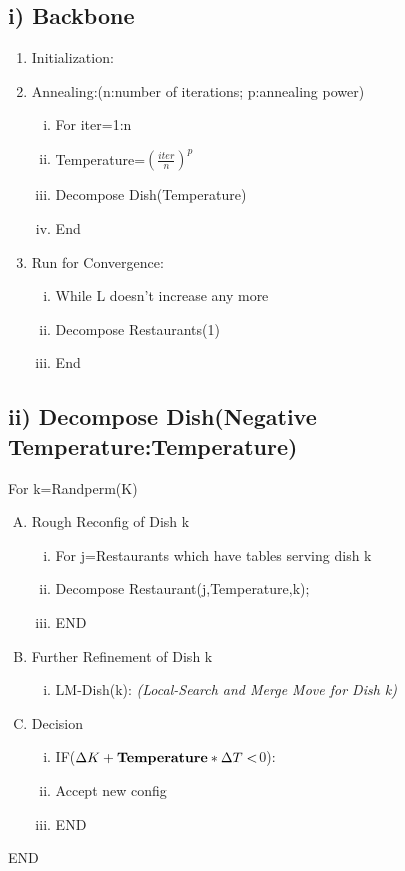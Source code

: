 \documentclass{article}
\begin{document}
\begin{spacing}{1.1}
\subsection{i) Backbone}
\begin{enumerate}[(1)]
\item Initialization:
\item Annealing:(n:number of iterations; p:annealing power)
\begin{enumerate}[(i)]
\item For iter=1:n
\item Temperature=$(\frac{iter}{n})^p$
\item Decompose Dish(Temperature)
\item End
\end{enumerate}
\item Run for Convergence:
\begin{enumerate}[(i)]
\item While L doesn't increase any more
\item Decompose Restaurants(1)
\item End
\end{enumerate}
\end{enumerate}

\subsection{ii) Decompose Dish(Negative Temperature:Temperature)}
For k=Randperm(K)
\begin{enumerate}[(A)]
\item Rough Reconfig of Dish k
\begin{enumerate}[(i)]
\item For j=Restaurants which have tables serving dish k
\item Decompose Restaurant(j,Temperature,k);
\item END
\end{enumerate} 
\item Further Refinement of Dish k
\begin{enumerate}[(i)]
\item LM-Dish(k):
\small{\emph{(Local-Search and Merge Move for Dish k)}}
\end{enumerate} 
\item Decision
\begin{enumerate}[(i)]
\item IF($\Delta K+{\bf Temperature}*\Delta T<$0):
\item Accept new config
\item END
\end{enumerate} 
\end{enumerate}
END

\end{spacing}
\end{document}
